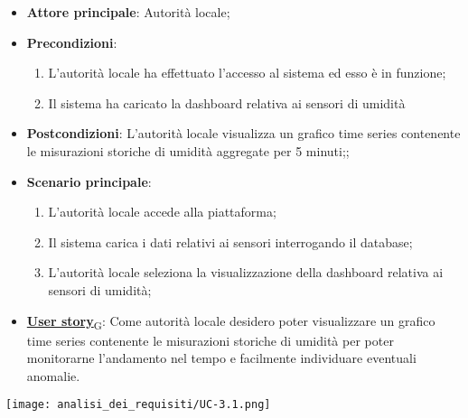 \begin{itemize}
	\item \textbf{Attore principale}: Autorità locale;
	\item \textbf{Precondizioni}:
	      \begin{enumerate}
		      \item L'autorità locale ha effettuato l'accesso al sistema ed esso è in funzione;
		      \item Il sistema ha caricato la dashboard relativa ai sensori di umidità
	      \end{enumerate}
	\item \textbf{Postcondizioni}: L'autorità locale visualizza un grafico time series contenente le misurazioni storiche
	      di umidità aggregate per 5 minuti;;
	\item \textbf{Scenario principale}:
	      \begin{enumerate}
		      \item L'autorità locale accede alla piattaforma;
		      \item Il sistema carica i dati relativi ai sensori interrogando il database;
		      \item L'autorità locale seleziona la visualizzazione della dashboard relativa ai sensori di umidità;
	      \end{enumerate}
	\item \href{https://7last.github.io/docs/rtb/documentazione-interna/glossario\#user-story}{\textbf{User story}\textsubscript{G}}:
	      Come autorità locale desidero poter visualizzare un grafico time series contenente le misurazioni storiche
	      di umidità per poter monitorarne l'andamento nel tempo e facilmente individuare eventuali anomalie.
\end{itemize}
\begin{center}
	\texttt{[image: analisi\_dei\_requisiti/UC-3.1.png]}
\end{center}

